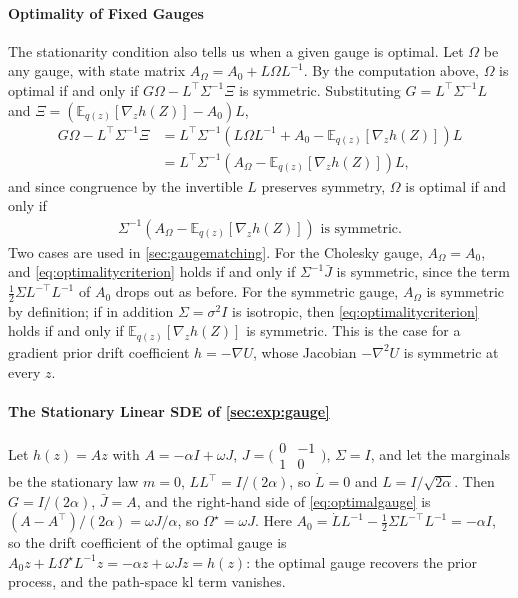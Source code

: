\documentclass{article} %
\newcommand{\priordrift}{h}
\newcommand{\gauge}{\Omega}
\newcommand{\E}{\mathbb{E}}
\begin{document}
\paragraph{Optimality of Fixed Gauges}
The stationarity condition also tells us when a given gauge is optimal. Let $\gauge$ be any gauge, with state matrix $A_\gauge = A_0 + L \gauge L^{-1}$. By the computation above, $\gauge$ is optimal if and only if $G \gauge - L^\top \Sigma^{-1} \Xi$ is symmetric. Substituting $G = L^\top \Sigma^{-1} L$ and $\Xi = (\E_{q(z)}[\nabla_z \priordrift(Z)] - A_0) L$,
\begin{align*}
    G \gauge - L^\top \Sigma^{-1} \Xi &= L^\top \Sigma^{-1} \left( L \gauge L^{-1} + A_0 - \E_{q(z)}[\nabla_z \priordrift(Z)] \right) L \\
    &= L^\top \Sigma^{-1} \left( A_\gauge - \E_{q(z)}[\nabla_z \priordrift(Z)] \right) L,
\end{align*}
and since congruence by the invertible $L$ preserves symmetry, $\gauge$ is optimal if and only if
\begin{align}
    \Sigma^{-1} \left( A_\gauge - \E_{q(z)}\left[\nabla_z \priordrift(Z)\right] \right) \text{ is symmetric.} \label{eq:optimalitycriterion}
\end{align}
Two cases are used in \cref{sec:gaugematching}. For the Cholesky gauge, $A_\gauge = A_0$, and \cref{eq:optimalitycriterion} holds if and only if $\Sigma^{-1} \bar J$ is symmetric, since the term $\frac{1}{2} \Sigma L^{-\top} L^{-1}$ of $A_0$ drops out as before. For the symmetric gauge, $A_\gauge$ is symmetric by definition; if in addition $\Sigma = \sigma^2 I$ is isotropic, then \cref{eq:optimalitycriterion} holds if and only if $\E_{q(z)}[\nabla_z \priordrift(Z)]$ is symmetric. This is the case for a gradient prior drift coefficient $\priordrift = -\nabla U$, whose Jacobian $-\nabla^2 U$ is symmetric at every $z$.

\paragraph{The Stationary Linear SDE of \cref{sec:exp:gauge}}
Let $\priordrift(z) = A z$ with $A = -\alpha I + \omega J$, $J = \bigl(\begin{smallmatrix} 0 & -1 \\ 1 & 0 \end{smallmatrix}\bigr)$, $\Sigma = I$, and let the marginals be the stationary law $m = 0$, $L L^\top = I / (2 \alpha)$, so $\dot L = 0$ and $L = I / \sqrt{2 \alpha}$. Then $G = I / (2 \alpha)$, $\bar J = A$, and the right-hand side of \cref{eq:optimalgauge} is $(A - A^\top) / (2 \alpha) = \omega J / \alpha$, so $\gauge^\star = \omega J$. Here $A_0 = \dot L L^{-1} - \frac{1}{2} \Sigma L^{-\top} L^{-1} = -\alpha I$, so the drift coefficient of the optimal gauge is $A_0 z + L \gauge^\star L^{-1} z = -\alpha z + \omega J z = \priordrift(z)$: the optimal gauge recovers the prior process, and the path-space \gls{kl} term vanishes.
\end{document}
